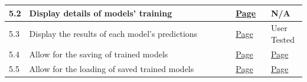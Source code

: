 \documentclass[./project-report/src/latex/project-report.tex]{subfiles}
\begin{document}
\begin{tabular}{|p{0.03\linewidth}|p{0.73\linewidth}|p{0.12\linewidth}|p{0.12\linewidth}|}
      \hline
      5.2 & Display details of models' training & \hyperref[sec:create_model-module]{Page \pageref{sec:create_model-module}} & N/A \\
      \hline
      5.3 & Display the results of each model's predictions & \hyperref[sec:test_model-module]{Page \pageref{sec:test_model-module}} & User Tested \\
      \hline
      5.4 & Allow for the saving of trained models & \hyperref[sec:test_model-module]{Page \pageref{sec:test_model-module}} & \hyperref[sec:test-frames-input-validation]{Page \pageref{sec:test-frames-input-validation}} \\
      \hline
      5.5 & Allow for the loading of saved trained models & \hyperref[sec:load_model-module]{Page \pageref{sec:load_model-module}} & \hyperref[sec:load-model-frame-input-validation]{Page \pageref{sec:load-model-frame-input-validation}} \\
      \hline
\end{tabular}

\pagebreak
\end{document}
